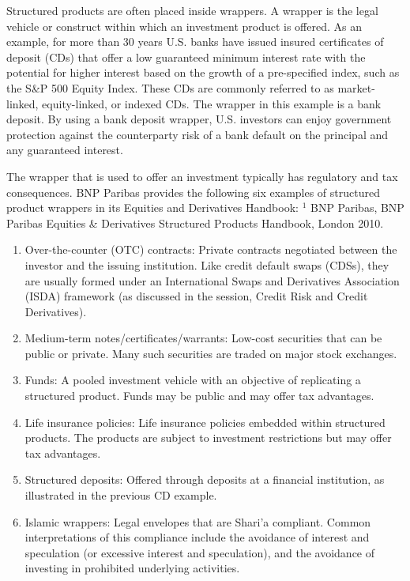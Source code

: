 \documentclass[11pt]{article}
\begin{document}
Structured products are often placed inside wrappers. A wrapper is the legal vehicle or construct within which an investment product is offered. As an example, for more than 30 years U.S. banks have issued insured certificates of deposit (CDs) that offer a low guaranteed minimum interest rate with the potential for higher interest based on the growth of a pre-specified index, such as the S\&P 500 Equity Index. These CDs are commonly referred to as market-linked, equity-linked, or indexed CDs. The wrapper in this example is a bank deposit. By using a bank deposit wrapper, U.S. investors can enjoy government protection against the counterparty risk of a bank default on the principal and any guaranteed interest.

The wrapper that is used to offer an investment typically has regulatory and tax consequences. BNP Paribas provides the following six examples of structured product wrappers in its Equities and Derivatives Handbook: ${ }^{1}$ BNP Paribas, BNP Paribas Equities \& Derivatives Structured Products Handbook, London 2010.

\begin{enumerate}
  \item Over-the-counter (OTC) contracts: Private contracts negotiated between the investor and the issuing institution. Like credit default swaps (CDSs), they are usually formed under an International Swaps and Derivatives Association (ISDA) framework (as discussed in the session, Credit Risk and Credit Derivatives).

  \item Medium-term notes/certificates/warrants: Low-cost securities that can be public or private. Many such securities are traded on major stock exchanges.

  \item Funds: A pooled investment vehicle with an objective of replicating a structured product. Funds may be public and may offer tax advantages.

  \item Life insurance policies: Life insurance policies embedded within structured products. The products are subject to investment restrictions but may offer tax advantages.

  \item Structured deposits: Offered through deposits at a financial institution, as illustrated in the previous CD example.

  \item Islamic wrappers: Legal envelopes that are Shari'a compliant. Common interpretations of this compliance include the avoidance of interest and speculation (or excessive interest and speculation), and the avoidance of investing in prohibited underlying activities.

\end{enumerate}
\end{document}
